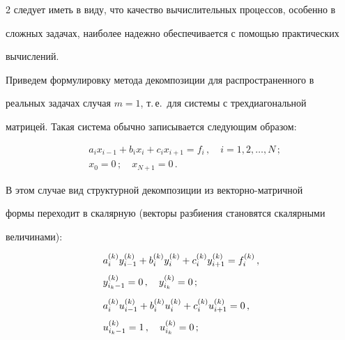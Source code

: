 \begin{multicols}{2}
следует иметь в виду, что качество вычислительных процессов, особенно в


сложных задачах, наиболее надежно обеспечивается с помощью практических


вычислений.





     Приведем формулировку метода декомпозиции для распространенного в


реальных задачах случая $m = 1$, т.\,е.\ для системы с трехдиагональной


мат\-ри\-цей. Такая система обычно записывается сле\-ду\-ющим образом:


     \begin{align*}


     &a_i x_{i-1} +b_ix_i +c_ix_{i+1} = f_i\,,\quad i=1, 2, \ldots , N\,;


     \\


&x_0 =0 \,; \quad x_{N+1} =0\,.


     \end{align*}





     В этом случае вид структурной декомпозиции из векторно-матричной


формы переходит в скалярную (векторы разбиения становятся скалярными


величинами):


     \begin{align}


&     a_i^{(k)} y_{i-1}^{(k)} +b_i^{(k)}y_i^{(k)} +c_i^{(k)} y_{i+1}^{(k)}  =


f_i^{(k)}\,,\notag\\[-6pt]


     & \label{e13ol}\\[-6pt]


 &    y^{(k)}_{i_k-1}  =0\,,\quad y_{i_k}^{(k)} =0\,;\notag\\[6pt]


&     a_i^{(k)} u_{i-1}^{(k)} +b_i^{(k)}u_i^{(k)} +c_i^{(k)} u_{i+1}^{(k)}  =


0\,,\notag\\[-6pt]


     & \label{e14ol}\\[-6pt]


&     u^{(k)}_{i_k-1}  =1\,,\quad u_{i_k}^{(k)} =0\,;\notag\\[6pt]



\end{align}
\end{multicols}

